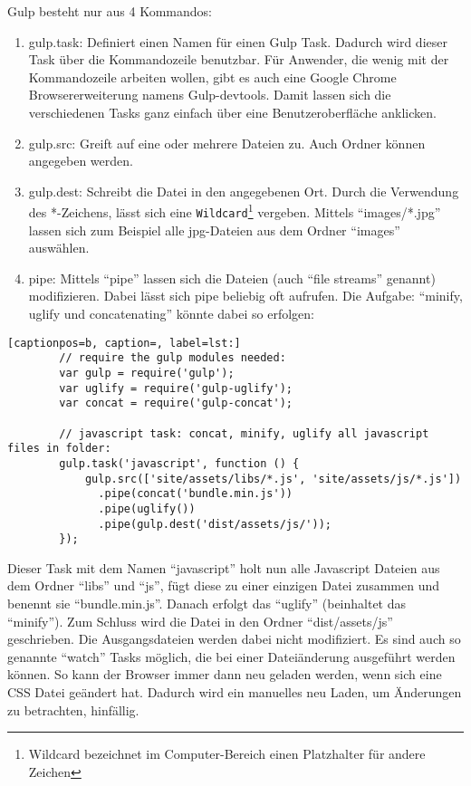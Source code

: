 		Gulp besteht nur aus 4 Kommandos:
		\begin{enumerate}
			\item gulp.task: Definiert einen Namen für einen Gulp Task. Dadurch wird dieser Task über die Kommandozeile benutzbar. Für Anwender, die wenig mit der Kommandozeile arbeiten wollen, gibt es auch eine Google Chrome Browsererweiterung namens Gulp-devtools. Damit lassen sich die verschiedenen Tasks ganz einfach über eine Benutzeroberfläche anklicken.

			\item gulp.src: Greift auf eine oder mehrere Dateien zu. Auch Ordner können angegeben werden.

			\item gulp.dest: Schreibt die Datei in den angegebenen Ort. Durch die Verwendung des *-Zeichens, lässt sich eine \texttt{Wildcard}\footnote{Wildcard bezeichnet im Computer-Bereich einen Platzhalter für andere Zeichen} vergeben. Mittels "`images/*.jpg"' lassen sich zum Beispiel alle jpg-Dateien aus dem Ordner "`images"' auswählen.

			\item pipe: Mittels "`pipe"' lassen sich die Dateien (auch "`file streams"'  genannt) modifizieren. Dabei lässt sich pipe beliebig oft aufrufen. Die Aufgabe: "`minify, uglify und concatenating"' könnte dabei so erfolgen:

		\end{enumerate}

		\begin{lstlisting}[captionpos=b, caption=, label=lst:]
		// require the gulp modules needed:
		var gulp = require('gulp');
		var uglify = require('gulp-uglify');
		var concat = require('gulp-concat');

		// javascript task: concat, minify, uglify all javascript files in folder:
		gulp.task('javascript', function () {
		    gulp.src(['site/assets/libs/*.js', 'site/assets/js/*.js'])
		      .pipe(concat('bundle.min.js')) 
		      .pipe(uglify())
		      .pipe(gulp.dest('dist/assets/js/'));
		});
		\end{lstlisting}
		Dieser Task mit dem Namen "`javascript"' holt nun alle Javascript Dateien aus dem Ordner "`libs"' und "`js"', fügt diese zu einer einzigen Datei zusammen und benennt sie "`bundle.min.js"'. Danach erfolgt das "`uglify"' (beinhaltet das "`minify"'). Zum Schluss wird die Datei in den Ordner "`dist/assets/js"' geschrieben. Die Ausgangsdateien werden dabei nicht modifiziert. Es sind auch so genannte "`watch"' Tasks möglich, die bei einer Dateiänderung ausgeführt werden können. So kann der Browser immer dann neu geladen werden, wenn sich eine CSS Datei geändert hat. Dadurch wird ein manuelles neu Laden, um Änderungen zu betrachten, hinfällig.\\	

